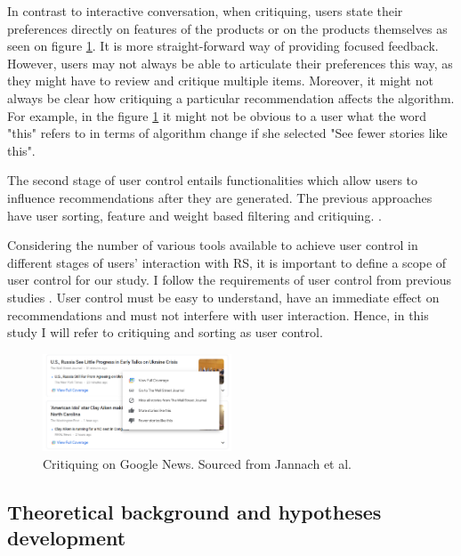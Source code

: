 \documentclass[a4paper,12pt]{article}
\newcommand{\citeyearonly}[1]{\citeyearpar{#1}}
\begin{document}
In contrast to interactive conversation, when critiquing, users state their preferences directly on features of the products or on the products themselves as seen on figure \ref{fig:critiquing}. It is more straight-forward way of providing focused feedback. However, users may not always be able to articulate their preferences this way, as they might have to review and critique multiple items. Moreover, it might not always be clear how critiquing a particular recommendation affects the algorithm. For example, in the figure \ref{fig:critiquing} it might not be obvious to a user what the word "this" refers to in terms of algorithm change if she selected "See fewer stories like this".

The second stage of user control entails functionalities which allow users to influence recommendations after they are generated. The previous approaches have user sorting, feature and weight based filtering and critiquing. \citep{jannach2017user, bostandjiev2012tasteweights, swearingen2001beyond, schafer2002meta, schaffer2015hypothetical}. 

Considering the number of various tools available to achieve user control in different stages of users' interaction with RS, it is important to define a scope of user control for our study. I follow the requirements of user control from previous  studies \citep{jannach2017user}. User control must be easy to understand, have an immediate effect on recommendations and must not interfere with user interaction. Hence, in this study I will refer to critiquing and sorting as user control. 

\begin{figure}[H]
    \centering
    \includegraphics[width=0.5\textwidth]{staticFiles/critiquingRS.PNG}
    \caption{Critiquing on Google News. Sourced from Jannach et al. \citeyearonly{jannach2017user}}
    \label{fig:critiquing}
\end{figure}

\subsection{Theoretical background and hypotheses development}
\end{document}
